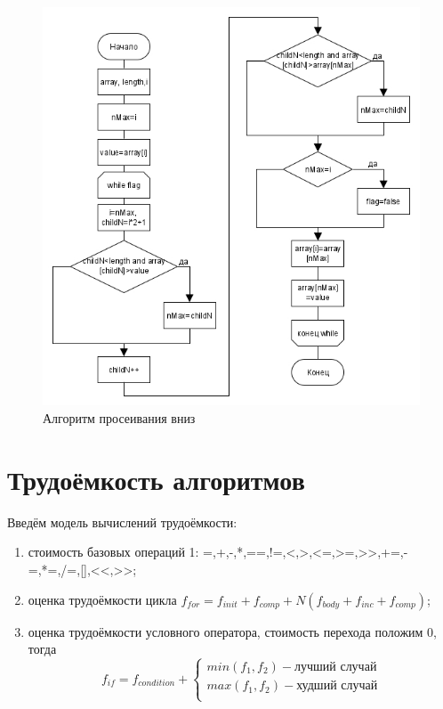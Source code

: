 \begin{figure}
	\centering
	\includegraphics[height=0.7\textheight]{src/siftDown}
	\caption{Алгоритм просеивания вниз}
	\label{fig:siftdown}
\end{figure}

\section{Трудоёмкость алгоритмов}
\label{sec:labour}
Введём модель вычислений трудоёмкости:
\begin{enumerate}[1)]
	\item стоимость базовых операций 1: =,+,-,*,==,!=,<,>,<=,>=,>>,+=,-=,*=,/=,[],<<,>>;
	\item оценка трудоёмкости цикла $f_{for}=f_{init}+f_{comp}+N(f_{body}+f_{inc}+f_{comp})$;
	\item оценка трудоёмкости условного оператора, стоимость перехода положим 0, тогда
	\begin{equation}
f_{if}=f_{condition}+\begin{cases}
min(f_{1},f_{2})-\text{лучший случай}\\
max(f_{1},f_{2})-\text{худший случай}\\
\end{cases}
	\end{equation} 
\end{enumerate}
